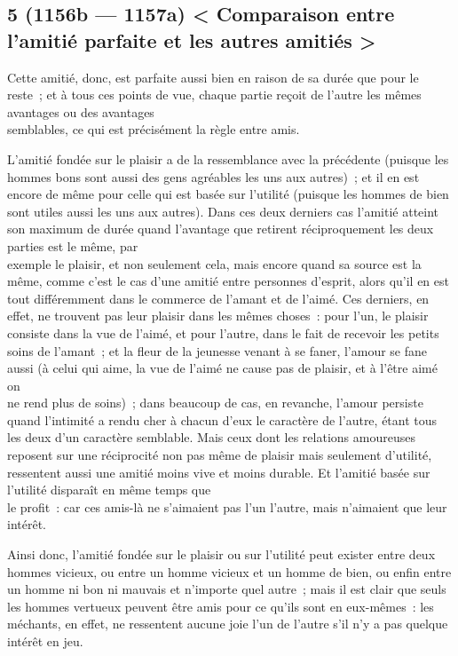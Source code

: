 \documentclass[french,twoside]{book} %
\begin{document}
\subsection[{5 (1156b — 1157a) < Comparaison entre l’amitié parfaite et les autres amitiés >}]{5 (1156b — 1157a) < Comparaison entre l’amitié parfaite et les autres amitiés >}
\noindent Cette amitié, donc, est parfaite aussi bien en raison de sa durée que pour le reste ; et à tous ces points de vue, chaque partie reçoit de l’autre les mêmes avantages ou des avantages \\
semblables, ce qui est précisément la règle entre amis.\par
 L’amitié fondée sur le plaisir a de la ressemblance avec la précédente (puisque les hommes bons sont aussi des gens agréables les uns aux autres) ; et il en est encore de même pour celle qui est basée sur l’utilité (puisque les hommes de bien sont utiles aussi les uns aux autres). Dans ces deux derniers cas l’amitié atteint son maximum de durée quand l’avantage que retirent réciproquement les deux parties est le même, par \\
exemple le plaisir, et non seulement cela, mais encore quand sa source est la même, comme c’est le cas d’une amitié entre personnes d’esprit, alors qu’il en est tout différemment dans le commerce de l’amant et de l’aimé. Ces derniers, en effet, ne trouvent pas leur plaisir dans les mêmes choses : pour l’un, le plaisir consiste dans la vue de l’aimé, et pour l’autre, dans le fait de recevoir les petits soins de l’amant ; et la fleur de la jeunesse venant à se faner, l’amour se fane aussi (à celui qui aime, la vue de l’aimé ne cause pas de plaisir, et à l’être aimé on \\
ne rend plus de soins) ; dans beaucoup de cas, en revanche, l’amour persiste quand l’intimité a rendu cher à chacun d’eux le caractère de l’autre, étant tous les deux d’un caractère semblable. Mais ceux dont les relations amoureuses reposent sur une réciprocité non pas même de plaisir mais seulement d’utilité, ressentent aussi une amitié moins vive et moins durable. Et l’amitié basée sur l’utilité disparaît en même temps que \\
le profit : car ces amis-là ne s’aimaient pas l’un l’autre, mais n’aimaient que leur intérêt.\par
Ainsi donc, l’amitié fondée sur le plaisir ou sur l’utilité peut exister entre deux hommes vicieux, ou entre un homme vicieux et un homme de bien, ou enfin entre un homme ni bon ni mauvais et n’importe quel autre ; mais il est clair que seuls les hommes vertueux peuvent être amis pour ce qu’ils sont en eux-mêmes : les méchants, en effet, ne ressentent aucune joie l’un de l’autre s’il n’y a pas quelque intérêt en jeu.\par
\end{document}
